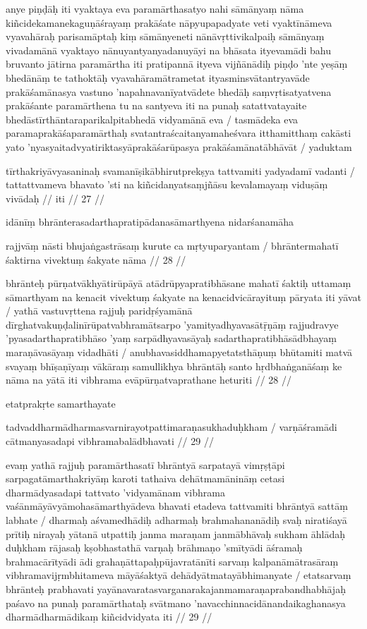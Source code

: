 anye piṇḍāḥ iti vyaktaya eva paramārthasatyo nahi sāmānyaṃ nāma kiñcidekamanekaguṇāśrayaṃ prakāśate nāpyupapadyate veti vyaktīnāmeva vyavahāraḥ parisamāptaḥ kiṃ sāmānyeneti nānāvṛttivikalpaiḥ sāmānyaṃ vivadamānā vyaktayo nānuyantyanyadanuyāyi na bhāsata ityevamādi bahu bruvanto jātirna paramārtha iti pratipannā ityeva vijñānādiḥ piṇḍo 'nte yeṣāṃ bhedānāṃ te tathoktāḥ vyavahāramātrametat ityasminsvātantryavāde prakāśamānasya vastuno 'napahnavanīyatvādete bhedāḥ saṃvṛtisatyatvena prakāśante paramārthena tu na santyeva iti na punaḥ satattvatayaite bhedāstīrthāntaraparikalpitabhedā vidyamānā eva  / tasmādeka eva paramaprakāśaparamārthaḥ svatantraścaitanyamaheśvara itthamitthaṃ cakāsti yato 'nyasyaitadvyatiriktasyāprakāśarūpasya prakāśamānatābhāvāt  / yaduktam

tīrthakriyāvyasaninaḥ svamanīṣikābhirutprekṣya tattvamiti yadyadamī vadanti  /
tattattvameva bhavato 'sti na kiñcidanyatsaṃjñāsu kevalamayaṃ viduṣāṃ vivādaḥ  //
iti  // 27  //

idānīṃ bhrānterasadarthapratipādanasāmarthyena nidarśanamāha

rajjvāṃ nāsti bhujaṅgastrāsaṃ kurute ca mṛtyuparyantam  /
bhrāntermahatī śaktirna vivektuṃ śakyate nāma  // 28  //

bhrānteḥ pūrṇatvākhyātirūpāyā atādrūpyapratibhāsane mahatī śaktiḥ uttamaṃ sāmarthyam na kenacit vivektuṃ śakyate na kenacidvicārayituṃ pāryata iti yāvat  / yathā vastuvṛttena rajjuḥ paridṛśyamānā dīrghatvakuṇḍalinīrūpatvabhramātsarpo 'yamityadhyavasātṝṇāṃ rajjudravye 'pyasadarthapratibhāso 'yaṃ sarpādhyavasāyaḥ sadarthapratibhāsādbhayaṃ maraṇāvasāyaṃ vidadhāti  / anubhavasiddhamapyetatsthāṇuṃ bhūtamiti matvā svayaṃ bhīṣaṇīyaṃ vākāraṃ samullikhya bhrāntāḥ santo hṛdbhaṅganāśaṃ ke nāma na yātā iti vibhrama evāpūrṇatvaprathane heturiti  // 28  //

etatprakṛte samarthayate

tadvaddharmādharmasvarnirayotpattimaraṇasukhaduḥkham  /
varṇāśramādi cātmanyasadapi vibhramabalādbhavati  // 29  //

evaṃ yathā rajjuḥ paramārthasatī bhrāntyā sarpatayā vimṛṣṭāpi sarpagatāmarthakriyāṃ karoti tathaiva dehātmamānināṃ cetasi dharmādyasadapi tattvato 'vidyamānam vibhrama vaśānmāyāvyāmohasāmarthyādeva bhavati etadeva tattvamiti bhrāntyā sattāṃ labhate  / dharmaḥ aśvamedhādiḥ adharmaḥ brahmahananādiḥ svaḥ niratiśayā prītiḥ nirayaḥ yātanā utpattiḥ janma maraṇam janmābhāvaḥ sukham āhlādaḥ duḥkham rājasaḥ kṣobhastathā varṇaḥ brāhmaṇo 'smītyādi āśramaḥ brahmacārītyādi ādi grahaṇāttapaḥpūjavratānīti sarvaṃ kalpanāmātrasāraṃ vibhramavijṛmbhitameva māyāśaktyā dehādyātmatayābhimanyate  / etatsarvaṃ bhrānteḥ prabhavati yayānavaratasvarganarakajanmamaraṇaprabandhabhājaḥ paśavo na punaḥ paramārthataḥ svātmano 'navacchinnacidānandaikaghanasya dharmādharmādikaṃ kiñcidvidyata iti  // 29  //

